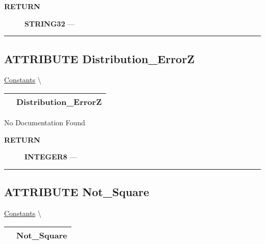 \par
\begin{description}
\item [\colorbox{tagtype}{\color{white} \textbf{\textsf{RETURN}}}] \textbf{STRING32} --- 
\end{description}




\rule{\linewidth}{0.5pt}
\subsection*{\textsf{\colorbox{headtoc}{\color{white} ATTRIBUTE}
Distribution\_ErrorZ}}

\hypertarget{ecldoc:pbblas.constants.distribution_errorz}{}
\hspace{0pt} \hyperlink{ecldoc:PBblas.Constants}{Constants} \textbackslash 

{\renewcommand{\arraystretch}{1.5}
\begin{tabularx}{\textwidth}{|>{\raggedright\arraybackslash}l|X|}
\hline
\hspace{0pt}\mytexttt{\color{red} } & \textbf{Distribution\_ErrorZ} \\
\hline
\end{tabularx}
}

\par





No Documentation Found








\par
\begin{description}
\item [\colorbox{tagtype}{\color{white} \textbf{\textsf{RETURN}}}] \textbf{INTEGER8} --- 
\end{description}




\rule{\linewidth}{0.5pt}
\subsection*{\textsf{\colorbox{headtoc}{\color{white} ATTRIBUTE}
Not\_Square}}

\hypertarget{ecldoc:pbblas.constants.not_square}{}
\hspace{0pt} \hyperlink{ecldoc:PBblas.Constants}{Constants} \textbackslash 

{\renewcommand{\arraystretch}{1.5}
\begin{tabularx}{\textwidth}{|>{\raggedright\arraybackslash}l|X|}
\hline
\hspace{0pt}\mytexttt{\color{red} } & \textbf{Not\_Square} \\
\hline
\end{tabularx}
}

